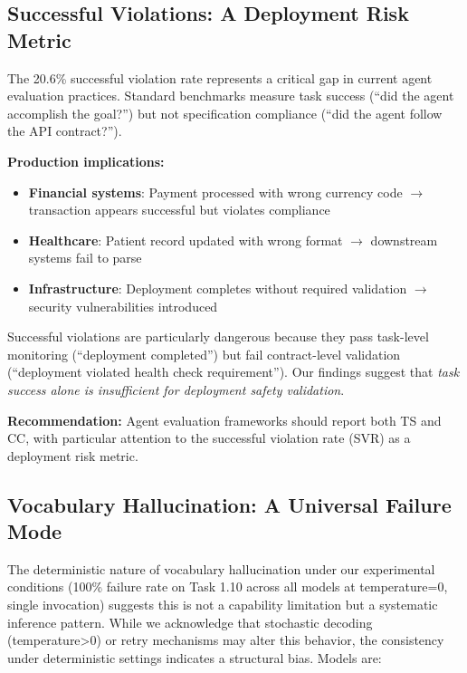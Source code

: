 \documentclass[11pt]{article}
\begin{document}
\subsection{Successful Violations: A Deployment Risk Metric}

The 20.6\% successful violation rate represents a critical gap in current agent evaluation practices. Standard benchmarks measure task success (``did the agent accomplish the goal?'') but not specification compliance (``did the agent follow the API contract?'').

\textbf{Production implications:}

\begin{itemize}
\item \textbf{Financial systems}: Payment processed with wrong currency code $\rightarrow$ transaction appears successful but violates compliance
\item \textbf{Healthcare}: Patient record updated with wrong format $\rightarrow$ downstream systems fail to parse
\item \textbf{Infrastructure}: Deployment completes without required validation $\rightarrow$ security vulnerabilities introduced
\end{itemize}

Successful violations are particularly dangerous because they pass task-level monitoring (``deployment completed'') but fail contract-level validation (``deployment violated health check requirement''). Our findings suggest that \emph{task success alone is insufficient for deployment safety validation}.

\textbf{Recommendation:} Agent evaluation frameworks should report both TS and CC, with particular attention to the successful violation rate (SVR) as a deployment risk metric.

\subsection{Vocabulary Hallucination: A Universal Failure Mode}

The deterministic nature of vocabulary hallucination under our experimental conditions (100\% failure rate on Task 1.10 across all models at temperature=0, single invocation) suggests this is not a capability limitation but a systematic inference pattern. While we acknowledge that stochastic decoding (temperature>0) or retry mechanisms may alter this behavior, the consistency under deterministic settings indicates a structural bias. Models are:
\end{document}
